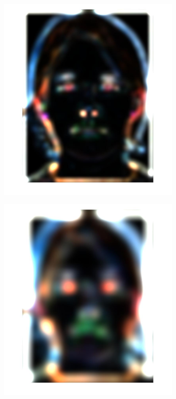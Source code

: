 \documentclass[a4paper]{iacas}
\begin{document}
\begin{figure}[!htbp]
\begin{subfigure}[b]{0.15\textwidth}
		\caption{}
		\label{fig:152}
	\end{subfigure}
	\begin{subfigure}[b]{0.15\textwidth}
		\includegraphics[width=\textwidth]{153.jpg}
		\caption{}
		\label{fig:153}
	\end{subfigure}
	\begin{subfigure}[b]{0.15\textwidth}
		\includegraphics[width=\textwidth]{154.jpg}

\end{subfigure}
\end{figure}
\end{document}
